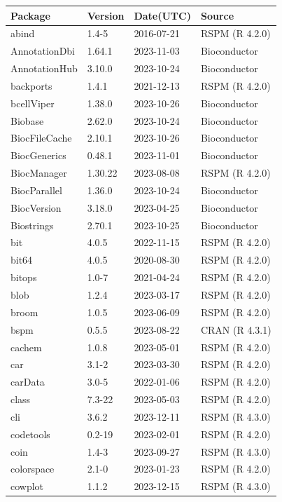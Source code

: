 \documentclass[graybox]{svmult}
\begin{document}
\begin{tabular}{llll}
Package & Version & Date(UTC) & Source\\
\hline
abind & 1.4-5 & 2016-07-21 & RSPM (R 4.2.0)\\
AnnotationDbi & 1.64.1 & 2023-11-03 & Bioconductor\\
AnnotationHub & 3.10.0 & 2023-10-24 & Bioconductor\\
backports & 1.4.1 & 2021-12-13 & RSPM (R 4.2.0)\\
bcellViper & 1.38.0 & 2023-10-26 & Bioconductor\\
\addlinespace
Biobase & 2.62.0 & 2023-10-24 & Bioconductor\\
BiocFileCache & 2.10.1 & 2023-10-26 & Bioconductor\\
BiocGenerics & 0.48.1 & 2023-11-01 & Bioconductor\\
BiocManager & 1.30.22 & 2023-08-08 & RSPM (R 4.2.0)\\
BiocParallel & 1.36.0 & 2023-10-24 & Bioconductor\\
\addlinespace
BiocVersion & 3.18.0 & 2023-04-25 & Bioconductor\\
Biostrings & 2.70.1 & 2023-10-25 & Bioconductor\\
bit & 4.0.5 & 2022-11-15 & RSPM (R 4.2.0)\\
bit64 & 4.0.5 & 2020-08-30 & RSPM (R 4.2.0)\\
bitops & 1.0-7 & 2021-04-24 & RSPM (R 4.2.0)\\
\addlinespace
blob & 1.2.4 & 2023-03-17 & RSPM (R 4.2.0)\\
broom & 1.0.5 & 2023-06-09 & RSPM (R 4.2.0)\\
bspm & 0.5.5 & 2023-08-22 & CRAN (R 4.3.1)\\
cachem & 1.0.8 & 2023-05-01 & RSPM (R 4.2.0)\\
car & 3.1-2 & 2023-03-30 & RSPM (R 4.2.0)\\
\addlinespace
carData & 3.0-5 & 2022-01-06 & RSPM (R 4.2.0)\\
class & 7.3-22 & 2023-05-03 & RSPM (R 4.2.0)\\
cli & 3.6.2 & 2023-12-11 & RSPM (R 4.3.0)\\
codetools & 0.2-19 & 2023-02-01 & RSPM (R 4.2.0)\\
coin & 1.4-3 & 2023-09-27 & RSPM (R 4.3.0)\\
\addlinespace
colorspace & 2.1-0 & 2023-01-23 & RSPM (R 4.2.0)\\
cowplot & 1.1.2 & 2023-12-15 & RSPM (R 4.3.0)\\

\end{tabular}
\end{document}
